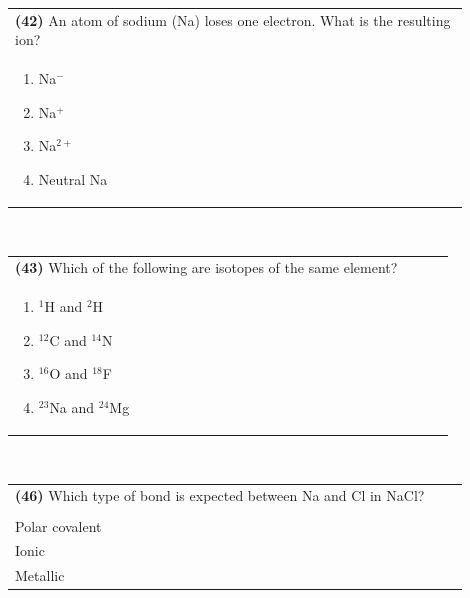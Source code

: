 \documentclass{article}
\begin{document}
\vspace{0.5cm}
\noindent \begin{tabular}{|p{0.9\linewidth}|}
\hline
\vspace{0.2cm}
\textbf{(42)} An atom of sodium (Na) loses one electron. What is the resulting ion? \\
\begin{minipage}[t]{0.85\linewidth}
\begin{enumerate}[label=\alph*.]
\item Na$^-$
\item Na$^{+}$
\item Na$^{2+}$
\item Neutral Na
\end{enumerate}
\end{minipage}\\
\hline
\end{tabular}
\\

\vspace{0.5cm}
\noindent \begin{tabular}{|p{0.9\linewidth}|}
\hline
\vspace{0.2cm}
\textbf{(43)} Which of the following are isotopes of the same element? \\
\begin{minipage}[t]{0.85\linewidth}
\begin{enumerate}[label=\alph*.]
\item $^{1}$H and $^{2}$H
\item $^{12}$C and $^{14}$N
\item $^{16}$O and $^{18}$F
\item $^{23}$Na and $^{24}$Mg
\end{enumerate}
\end{minipage}\\
\hline
\end{tabular}
\\

\vspace{0.5cm}
\noindent \begin{tabular}{|p{0.9\linewidth}|}
\hline
\vspace{0.2cm}
\textbf{(46)} Which type of bond is expected between Na and Cl in NaCl? \\
\begin{minipage}[t]{0.85\linewidth}
\begin{enumerate}[label=\alph*.]
\item Nonpolar covalent \\
\item Polar covalent \\
\item Ionic \\
\item Metallic
\end{enumerate}
\end{minipage}\\
\hline
\end{tabular}
\newpage
\end{document}
